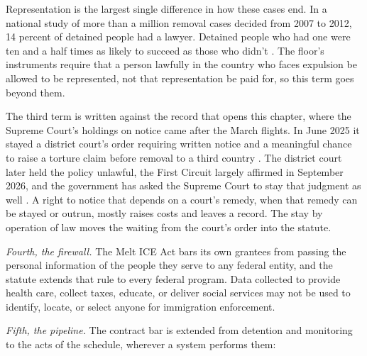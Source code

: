 Representation is the largest single difference in how these cases end. In a national study of more than a million removal cases decided from 2007 to 2012, 14 percent of detained people had a lawyer. Detained people who had one were ten and a half times as likely to succeed as those who didn't \autocite{EaglyShafer2016Counsel}. The floor's instruments require that a person lawfully in the country who faces expulsion be allowed to be represented, not that representation be paid for, so this term goes beyond them.

The third term is written against the record that opens this chapter, where the Supreme Court's holdings on notice came after the March flights. In June 2025 it stayed a district court's order requiring written notice and a meaningful chance to raise a torture claim before removal to a third country \autocite{dvd2025}. The district court later held the policy unlawful, the First Circuit largely affirmed in September 2026, and the government has asked the Supreme Court to stay that judgment as well \autocite{dvd2026application}. A right to notice that depends on a court's remedy, when that remedy can be stayed or outrun, mostly raises costs and leaves a record. The stay by operation of law moves the waiting from the court's order into the statute.

\emph{Fourth, the firewall.} The Melt ICE Act bars its own grantees from passing the personal information of the people they serve to any federal entity, and the statute extends that rule to every federal program. Data collected to provide health care, collect taxes, educate, or deliver social services may not be used to identify, locate, or select anyone for immigration enforcement.

\emph{Fifth, the pipeline.} The contract bar is extended from detention and monitoring to the acts of the schedule, wherever a system performs them:

